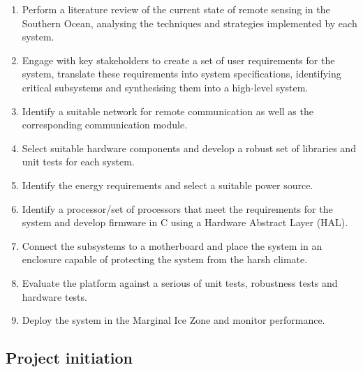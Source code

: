 \begin{enumerate}
    \item Perform a literature review of the current state of remote sensing in the Southern Ocean, analysing the techniques and strategies implemented by each system.
    
    \item Engage with key stakeholders to create a set of user requirements for the system, translate these requirements into system specifications, identifying critical subsystems and synthesising them into a high-level system.
    
    \item Identify a suitable network for remote communication as well as the corresponding communication module.
    
    \item Select suitable hardware components and develop a robust set of libraries and unit tests for each system.
    
    \item Identify the energy requirements and select a suitable power source.
    
    \item Identify a processor/set of processors that meet the requirements for the system and develop firmware in C using a Hardware Abstract Layer (HAL).
    
    \item Connect the subsystems to a motherboard and place the system in an enclosure capable of protecting the system from the harsh climate.
     
    \item Evaluate the platform against a serious of unit tests, robustness tests and  hardware tests.
    
    \item Deploy the system in the Marginal Ice Zone and monitor performance.
\end{enumerate}



\subsection{Project initiation}

